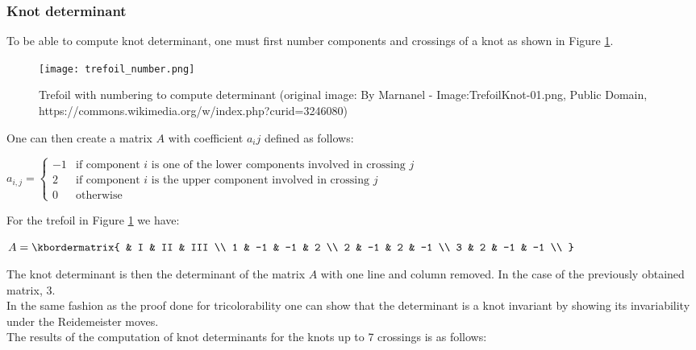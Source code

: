 \documentclass[12pt, a4paper]{article}
\begin{document}
\subsubsection{Knot determinant}

To be able to compute knot determinant, one must first number components and crossings of a knot as shown in Figure \ref{fig:trefoil_number}.

\begin{figure}[H]
  \centering
  \texttt{[image: trefoil\_number.png]}
  \caption{Trefoil with numbering to compute determinant (original image: By Marnanel - Image:TrefoilKnot-01.png, Public Domain, https://commons.wikimedia.org/w/index.php?curid=3246080)}
  \label{fig:trefoil_number}
\end{figure}

One can then create a matrix $A$ with coefficient $a_{i}{j}$ defined as follows:\\

\begin{center}
  $a_{i,j} =
  \begin{cases}
    -1 &\text{if component $i$ is one of the lower components involved in crossing $j$}\\
    2 &\text{if component $i$ is the upper component involved in crossing $j$}\\
    0 &\text{otherwise}
  \end{cases}$
\end{center}

For the trefoil in Figure \ref{fig:trefoil_number} we have:

\begin{center}
$
  A = \kbordermatrix{
    & I & II & III \\
    1 & -1 & -1 & 2  \\
    2 & -1 & 2 & -1  \\
    3 & 2 & -1 & -1  \\
  }
$
\end{center}

The knot determinant is then the determinant of the matrix $A$ with one line and column removed. In the case of the previously obtained matrix, 3.\\

In the same fashion as the proof done for tricolorability one can show that the determinant is a knot invariant by showing its invariability under the Reidemeister moves.\\

The results of the computation of knot determinants for the knots up to 7 crossings is as follows:\\
\end{document}
